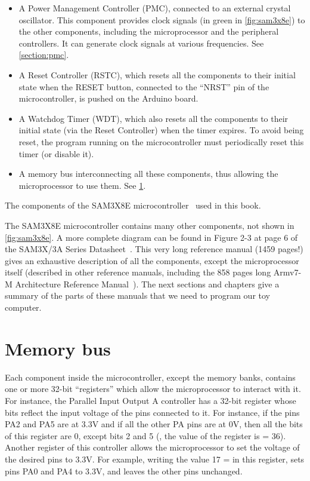 \begin{itemize}
  \item A Power Management Controller (PMC), connected to an external crystal
	oscillator. This component provides clock signals (in green in
	\cref{fig:sam3x8e}) to the other components, including the microprocessor and
	the peripheral controllers. It can generate clock signals at various
	frequencies. See \cref{section:pmc}.

  \item A Reset Controller (RSTC), which resets all the components to their
	initial state when the RESET button, connected to the ``NRST'' pin of the
	microcontroller, is pushed on the Arduino board.

  \item A Watchdog Timer (WDT), which also resets all the components to their
	initial state (via the Reset Controller) when the timer expires. To avoid
	being reset, the program running on the microcontroller must periodically
	reset this timer (or disable it).

  \item A memory bus interconnecting all these components, thus allowing the
	microprocessor to use them. See
	\cref{section:memory-bus}.
\end{itemize}

\begin{Figure}[ht]
  

  \caption{The components of the SAM3X8E microcontroller~\cite{SAM3X8E} used in
    this book.}\label{fig:sam3x8e}
\end{Figure}

The SAM3X8E microcontroller contains many other components, not shown in
\cref{fig:sam3x8e}. A more complete diagram can be found in Figure 2-3 at page
6 of the SAM3X/3A Series Datasheet~\cite{SAM3X8E}. This very long reference
manual (1459 pages!) gives an exhaustive description of all the components,
except the microprocessor itself (described in other reference manuals,
including the 858 pages long Armv7-M Architecture Reference
Manual~\cite{ARMv7}). The next sections and chapters give a summary of the
parts of these manuals that we need to program our toy computer.

\section{Memory bus}\label{section:memory-bus}

Each component inside the microcontroller, except the memory banks, contains
one or more 32-bit ``registers'' which allow the microprocessor to interact
with it. For instance, the Parallel Input Output A controller has a 32-bit
register whose bits reflect the input voltage of the pins connected to it. For
instance, if the pins PA2 and PA5 are at 3.3V and if all the other PA pins are
at 0V, then all the bits of this register are 0, except bits 2 and 5 (\ie, the
value of the register is  = 36). Another register of this
controller allows the microprocessor to set the voltage of the desired pins to
3.3V. For example, writing the value 17 =  in this register, sets
pins PA0 and PA4 to 3.3V, and leaves the other pins unchanged.

